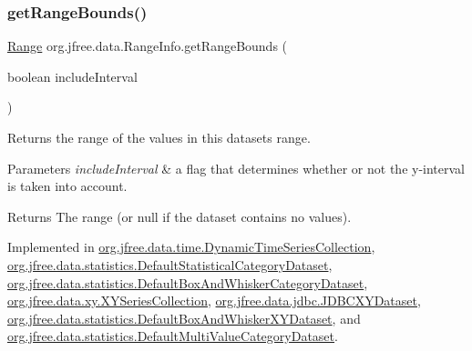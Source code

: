 \subsubsection{\texorpdfstring{get\+Range\+Bounds()}{getRangeBounds()}}
{\footnotesize\ttfamily \mbox{\hyperlink{classorg_1_1jfree_1_1data_1_1_range}{Range}} org.\+jfree.\+data.\+Range\+Info.\+get\+Range\+Bounds (\begin{DoxyParamCaption}\item[{boolean}]{include\+Interval }\end{DoxyParamCaption})}

Returns the range of the values in this dataset\textquotesingle{}s range.


\begin{DoxyParams}{Parameters}
{\em include\+Interval} & a flag that determines whether or not the y-\/interval is taken into account.\\
\hline
\end{DoxyParams}
\begin{DoxyReturn}{Returns}
The range (or {\ttfamily null} if the dataset contains no values). 
\end{DoxyReturn}


Implemented in \mbox{\hyperlink{classorg_1_1jfree_1_1data_1_1time_1_1_dynamic_time_series_collection_a3b7aac25736fd7122623ee6ae64104f7}{org.\+jfree.\+data.\+time.\+Dynamic\+Time\+Series\+Collection}}, \mbox{\hyperlink{classorg_1_1jfree_1_1data_1_1statistics_1_1_default_statistical_category_dataset_ac3440b80805636d47b07b69ee1407b35}{org.\+jfree.\+data.\+statistics.\+Default\+Statistical\+Category\+Dataset}}, \mbox{\hyperlink{classorg_1_1jfree_1_1data_1_1statistics_1_1_default_box_and_whisker_category_dataset_a52f3bf900ae6f640a115f6872e702f01}{org.\+jfree.\+data.\+statistics.\+Default\+Box\+And\+Whisker\+Category\+Dataset}}, \mbox{\hyperlink{classorg_1_1jfree_1_1data_1_1xy_1_1_x_y_series_collection_af2e690925c633815d6e33f1b83b5040e}{org.\+jfree.\+data.\+xy.\+X\+Y\+Series\+Collection}}, \mbox{\hyperlink{classorg_1_1jfree_1_1data_1_1jdbc_1_1_j_d_b_c_x_y_dataset_ae0f62e6428726eda9b6d9736c11ac5c6}{org.\+jfree.\+data.\+jdbc.\+J\+D\+B\+C\+X\+Y\+Dataset}}, \mbox{\hyperlink{classorg_1_1jfree_1_1data_1_1statistics_1_1_default_box_and_whisker_x_y_dataset_ade8ae37e23cdb7c0b3cee5576785db74}{org.\+jfree.\+data.\+statistics.\+Default\+Box\+And\+Whisker\+X\+Y\+Dataset}}, and \mbox{\hyperlink{classorg_1_1jfree_1_1data_1_1statistics_1_1_default_multi_value_category_dataset_a30d182a50c2a77a29a772029d2ca3354}{org.\+jfree.\+data.\+statistics.\+Default\+Multi\+Value\+Category\+Dataset}}.

